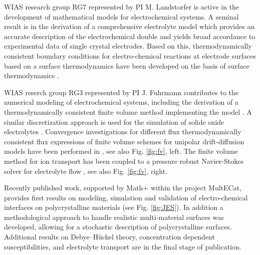 \documentclass[a4paper,10pt]{article}
\begin{document}
WIAS research group  RG7 represented by PI M. Landstorfer is active
in the development of mathematical models for electrochemical systems.
A seminal result is in the derivation of a comprehensive electrolyte model 
which provides an accurate description of the electrochemical double and yields broad accordance to experimental data of single crystal electrodes. %
Based on this, thermodynamically consistent boundary conditions for electro-chemical reactions at electrode surfaces based on a surface thermodynamics have been developed on the basis of surface thermodynamics \cite{DGM2013,DGL2014,Landstorfer2016187,landstorfer2017boundary}.

WIAS reserch group RG3 represented by PI J. Fuhrmann contributes to the numerical modeling of electrochemical systems,
including the derivation of a thermodynamically consistent finite volume  method \cite{JF2016} implementing
the model \cite{DGL2014}. A similar discretization approach is used for the simulation
of solide oxide electrolytes \cite{VagnerEtAl2019}. Convergence investigations for different flux
thermodynamically consistent flux expressions of  finite volume
schemes for unipolar drift-diffusion models  have been  performed in \cite{CCFG2020}, see also Fig. \ref{fig:fv}, left. The finite volume method for
ion transport has been coupled to a pressure robust Navier-Stokes solver for electrolyte flow
\cite{FGLMMSpringer2019,FuhrmannEtAlECActa2019}, see also Fig. \ref{fig:fv}, right.

Recently published work\cite{JES}, supported by Math+ within the project MultECat, provides first results on modeling, simulation and validation of electro-chemical interfaces on polycrystalline materials (see Fig. \ref{fig:JES}). In addition a methodological approach to handle realistic multi-material surfaces was developed, allowing for a stochastic description of polycrystalline surfaces. Additional results on Debye--Hückel theory, concentration dependent susceptibilities, and electrolyte transport are in the final stage of publication. %
\end{document}
